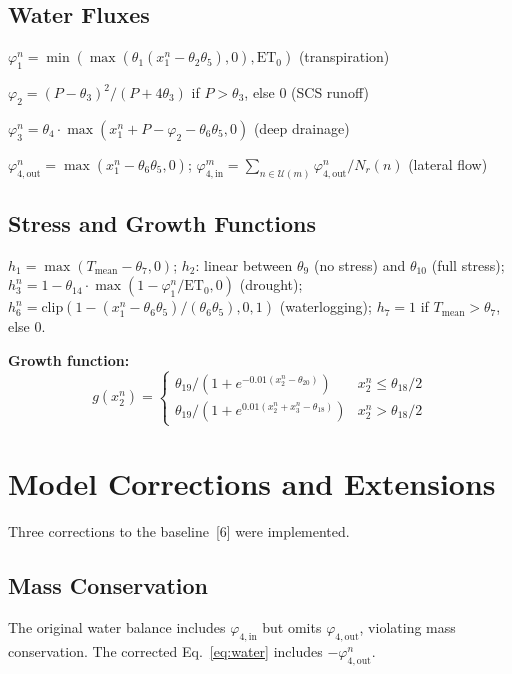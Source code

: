 \documentclass[12pt,a4paper]{article}
\begin{document}
\subsection{Water Fluxes}

$\varphi_1^n = \min(\max(\theta_1(x_1^n - \theta_2\theta_5), 0), \text{ET}_0)$ (transpiration)

$\varphi_2 = (P-\theta_3)^2/(P+4\theta_3)$ if $P > \theta_3$, else 0 (SCS runoff)

$\varphi_3^n = \theta_4 \cdot \max(x_1^n + P - \varphi_2 - \theta_6\theta_5, 0)$ (deep drainage)

$\varphi_{4,\text{out}}^n = \max(x_1^n - \theta_6\theta_5, 0)$; $\varphi_{4,\text{in}}^m = \sum_{n \in \mathcal{U}(m)} \varphi_{4,\text{out}}^n / N_r(n)$ (lateral flow)

\subsection{Stress and Growth Functions}

$h_1 = \max(T_{\text{mean}} - \theta_7, 0)$; $h_2$: linear between $\theta_9$ (no stress) and $\theta_{10}$ (full stress); $h_3^n = 1 - \theta_{14} \cdot \max(1 - \varphi_1^n/\text{ET}_0, 0)$ (drought); $h_6^n = \text{clip}(1 - (x_1^n - \theta_6\theta_5)/(\theta_6\theta_5), 0, 1)$ (waterlogging); $h_7 = 1$ if $T_{\text{mean}} > \theta_7$, else 0.

\textbf{Growth function:}
\begin{equation}
g(x_2^n) = \begin{cases}
\theta_{19}/(1 + e^{-0.01(x_2^n - \theta_{20})}) & x_2^n \leq \theta_{18}/2 \\
\theta_{19}/(1 + e^{0.01(x_2^n + x_3^n - \theta_{18})}) & x_2^n > \theta_{18}/2
\end{cases}
\end{equation}


\section{Model Corrections and Extensions}

Three corrections to the baseline~[6] were implemented.

\subsection{Mass Conservation}

The original water balance includes $\varphi_{4,\text{in}}$ but omits $\varphi_{4,\text{out}}$, violating mass conservation. The corrected Eq.~\ref{eq:water} includes $-\varphi_{4,\text{out}}^n$.
\end{document}
